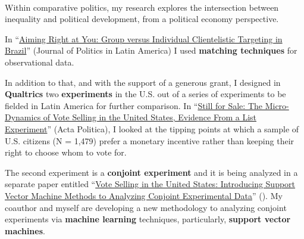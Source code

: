 \documentclass[10pt,stdletter,dateno,sigleft]{newlfm} %
\begin{document}
\begin{newlfm}




\vspace{-2cm}{\bf \huge Research Statement}\\

Within comparative politics, my research explores the intersection between inequality and political development, from a political economy perspective. %


In ``\href{https://journals.sub.uni-hamburg.de/giga/jpla/article/view/1121/1128}{Aiming Right at You: Group versus Individual Clientelistic Targeting in Brazil}'' (Journal of Politics in Latin America) I used {\bf matching techniques} for observational data. \unskip 


In addition to that, and with the support of a generous grant, I designed in {\bf Qualtrics} two {\bf experiments} in the U.S. out of a series of experiments to be fielded in Latin America for further comparison. In ``\href{https://github.com/hbahamonde/Vote_Selling/raw/master/Bahamonde_VoteSellingUS.pdf}{Still for Sale: The Micro-Dynamics of Vote Selling in the United States, Evidence From a List Experiment}'' (Acta Politica), I looked at the tipping points at which a sample of U.S. citizens (N = 1,479) prefer a monetary incentive rather than keeping their right to choose whom to vote for. \unskip 

The second experiment is a {\bf conjoint experiment} and it is being analyzed in a separate paper entitled ``\href{https://github.com/hbahamonde/Conjoint_US/raw/master/Bahamonde_Quininao_Conjoint.pdf}{Vote Selling in the United States: Introducing Support Vector Machine Methods to Analyzing Conjoint Experimental Data}'' (\emph{\unskip}). My coauthor and myself are developing a new methodology to analyzing conjoint experiments via {\bf machine learning} techniques, particularly, {\bf support vector machines}. {\unskip}


\end{newlfm}
\end{document}
